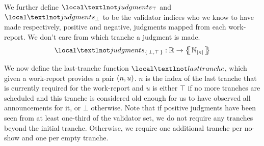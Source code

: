 We further define $\local¬judgments_\top$ and $\local¬judgments_\bot$ to be the validator indices who we know to have made respectively, positive and negative, judgments mapped from each work-report. We don't care from which tranche a judgment is made.
\begin{align}
  \local¬judgments_\bool: \workreport \to \protoset{\Nmax{\len{\activeset}}}
\end{align}

We now define the last-tranche function $\local¬lasttranche$, which given a work-report provides a pair $\tup{n, u}$. $n$ is the index of the last tranche that is currently required for the work-report and $u$ is either $\top$ if no more tranches are scheduled and this tranche is considered old enough for us to have observed all announcements for it, or $\bot$ otherwise. Note that if positive judgments have been seen from at least one-third of the validator set, we do not require any tranches beyond the initial tranche. Otherwise, we require one additional tranche per no-show and one per empty tranche.
